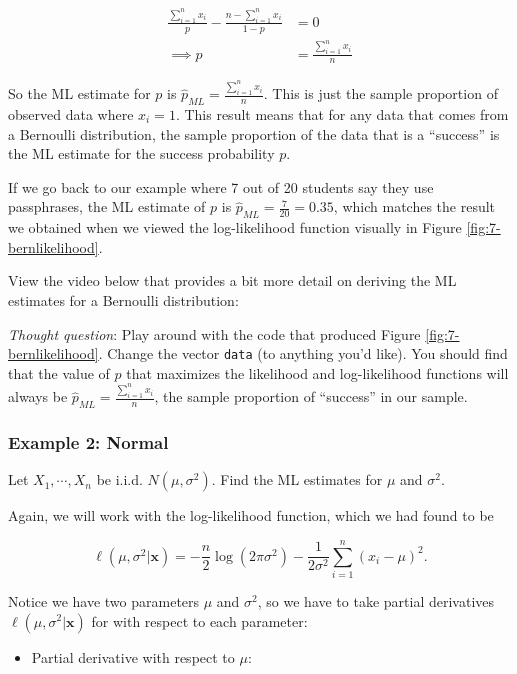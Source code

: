 \documentclass[
]{book}
\providecommand{\tightlist}{%
  \setlength{\itemsep}{0pt}\setlength{\parskip}{0pt}}
\begin{document}
\[
\begin{split}
\frac{\sum_{i=1}^n x_i}{p} - \frac{n - \sum_{i=1}^n x_i}{1-p} &= 0\\
                                               \implies p     &= \frac{\sum_{i=1}^n x_i}{n}
\end{split}
\]

So the ML estimate for \(p\) is \(\hat{p}_{ML} = \frac{\sum_{i=1}^n x_i}{n}\). This is just the sample proportion of observed data where \(x_i = 1\). This result means that for any data that comes from a Bernoulli distribution, the sample proportion of the data that is a ``success'' is the ML estimate for the success probability \(p\).

If we go back to our example where 7 out of 20 students say they use passphrases, the ML estimate of \(p\) is \(\hat{p}_{ML} = \frac{7}{20} = 0.35\), which matches the result we obtained when we viewed the log-likelihood function visually in Figure \ref{fig:7-bernlikelihood}.

View the video below that provides a bit more detail on deriving the ML estimates for a Bernoulli distribution:

\emph{Thought question}: Play around with the code that produced Figure \ref{fig:7-bernlikelihood}. Change the vector \texttt{data} (to anything you'd like). You should find that the value of \(p\) that maximizes the likelihood and log-likelihood functions will always be \(\hat{p}_{ML} = \frac{\sum_{i=1}^n x_i}{n}\), the sample proportion of ``success'' in our sample.

\hypertarget{example-2-normal-1}{%
\subsubsection{Example 2: Normal}\label{example-2-normal-1}}

Let \(X_1, \cdots, X_n\) be i.i.d. \(N(\mu, \sigma^2)\). Find the ML estimates for \(\mu\) and \(\sigma^2\).

Again, we will work with the log-likelihood function, which we had found to be

\[
\ell (\mu, \sigma^2 | \boldsymbol{x}) = -\frac{n}{2} \log (2 \pi \sigma^2) - \frac{1}{2 \sigma^2} \sum_{i=1}^n (x_i - \mu)^2.
\]

Notice we have two parameters \(\mu\) and \(\sigma^2\), so we have to take partial derivatives \(\ell (\mu, \sigma^2 | \boldsymbol{x})\) for with respect to each parameter:

\begin{itemize}
\tightlist
\item
  Partial derivative with respect to \(\mu\):
\end{itemize}
\end{document}
